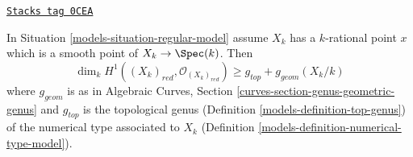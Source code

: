 \begin{lemma}
\label{models-lemma-genus-reduction-bigger-than}
\href{https://stacks.math.columbia.edu/tag/0CEA}{\texttt{Stacks tag 0CEA}}

In Situation \ref{models-situation-regular-model} assume $X_k$ has a $k$-rational
point $x$ which is a smooth point of $X_k \to \Spec(k)$. Then
$$
\dim_k H^1((X_k)_{red}, \mathcal{O}_{(X_k)_{red}}) \geq
g_{top} + g_{geom}(X_k/k)
$$
where $g_{geom}$ is as in
Algebraic Curves, Section \ref{curves-section-genus-geometric-genus}
and $g_{top}$ is the topological genus
(Definition \ref{models-definition-top-genus})
of the numerical type associated to $X_k$
(Definition \ref{models-definition-numerical-type-model}).
\end{lemma}

